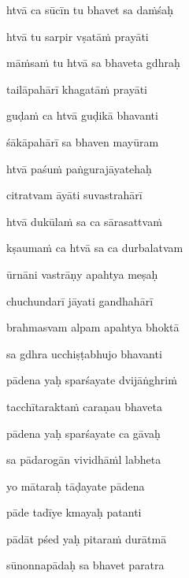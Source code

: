 \nemslokac 
htvā ca sūcīn tu bhavet sa da\.mśaḥ
\dontdisplaylinenum

\nemslokad 
htvā tu sarpir vṣatā\.m prayāti \veg\dontdisplaylinenum

\ujvers\nemsloka 
mā\.msa\.m tu htvā sa bhaveta gdhraḥ
\dontdisplaylinenum

\nemslokab 
tailāpahārī khagatā\.m prayāti \danda\dontdisplaylinenum

\nemslokac 
guḍa\.m ca htvā guḍikā bhavanti
\dontdisplaylinenum

\nemslokad 
śākāpahārī sa bhaven mayūram \veg\dontdisplaylinenum

\ujvers\nemsloka 
htvā paśu\.m paṅgurajāyatehaḥ
\dontdisplaylinenum

\nemslokab 
citratvam āyāti suvastrahārī \danda\dontdisplaylinenum

\nemslokac 
htvā dukūla\.m sa ca sārasattva\.m
\dontdisplaylinenum

\nemslokad 
kṣauma\.m ca htvā sa ca durbalatvam \veg\dontdisplaylinenum

\ujvers\nemsloka 
ūrnāni vastrāṇy apahtya meṣaḥ
\dontdisplaylinenum

\nemslokab 
chuchundarī jāyati gandhahārī \danda\dontdisplaylinenum

\nemslokac 
brahmasvam alpam apahtya bhoktā
\dontdisplaylinenum

\nemslokad 
sa gdhra ucchiṣṭabhujo bhavanti \veg\dontdisplaylinenum

\ujvers\nemsloka 
pādena yaḥ sparśayate dvijāṅghri\.m
\dontdisplaylinenum

\nemslokab 
tacchītarakta\.m caraṇau bhaveta \danda\dontdisplaylinenum

\nemslokac 
pādena yaḥ sparśayate ca gāvaḥ
\dontdisplaylinenum

\nemslokad 
sa pādarogān vividhā\.ml labheta \veg\dontdisplaylinenum

\ujvers\nemsloka 
yo mātaraḥ tāḍayate pādena
\dontdisplaylinenum

\nemslokab 
pāde tadīye kmayaḥ patanti \danda\dontdisplaylinenum

\nemslokac 
pādāt pśed yaḥ pitara\.m durātmā
\dontdisplaylinenum

\nemslokad 
sūnonnapādaḥ sa bhavet paratra \veg\dontdisplaylinenum

